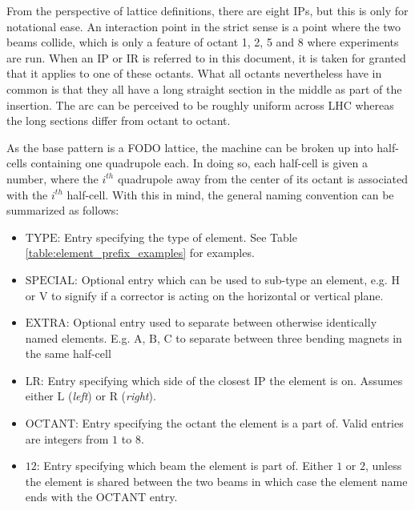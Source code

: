 From the perspective of lattice definitions, there are eight $\mathrm{IP}$s, but this is only for notational ease.
An interaction point in the strict sense is a point where the two beams collide, which is only a feature of octant 1, 2, 5 and 8 where experiments are run.
When an $\mathrm{IP}$ or $\mathrm{IR}$ is referred to in this document, it is taken for granted that it applies to one of these octants.
What all octants nevertheless have in common is that they all have a long straight section in the middle as part of the insertion.
The arc can be perceived to be roughly uniform across LHC whereas the long sections differ from octant to octant.


As the base pattern is a FODO lattice, the machine can be broken up into half-cells containing one quadrupole each.
In doing so, each half-cell is given a number, where the $i^{th}$ quadrupole away from the center of its octant is associated with the $i^{th}$ half-cell.
With this in mind, the general naming convention can be summarized as follows:


\begin{itemize}
    \item $\mathrm{TYPE}$: Entry specifying the type of element. See Table \ref{table:element_prefix_examples} for examples.
    \item $\mathrm{SPECIAL}$: Optional entry which can be used to sub-type an element, e.g. $\mathrm{H}$ or $\mathrm{V}$ to signify if a corrector is acting on the horizontal or vertical plane.
    \item $\mathrm{EXTRA}$: Optional entry used to separate between otherwise identically named elements. E.g. $\mathrm{A}$, $\mathrm{B}$, $\mathrm{C}$ to separate between three bending magnets in the same half-cell
    \item $\mathrm{LR}$: Entry specifying which side of the closest $\mathrm{IP}$ the element is on. Assumes either $\mathrm{L}$ (\textit{left}) or $\mathrm{R}$ (\textit{right}).
    \item $\mathrm{OCTANT}$: Entry specifying the octant the element is a part of. Valid entries are integers from $1$ to $8$.
    \item $\mathrm{12}$: Entry specifying which beam the element is part of. Either $1$ or $2$, unless the element is shared between the two beams in which case the element name ends with the $\mathrm{OCTANT}$ entry.
\end{itemize}

